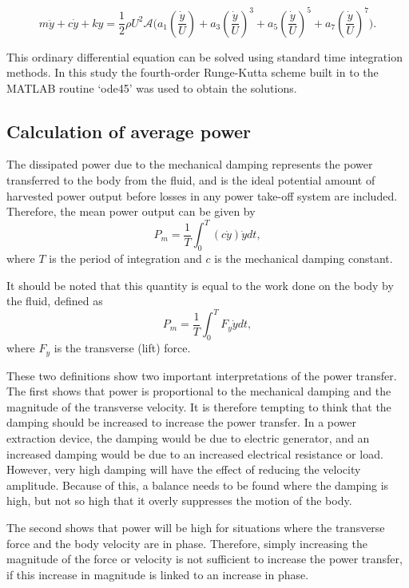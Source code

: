 \begin{equation}
\label{final_equation_motion}
m\ddot{y}{+}c\dot{y}{+}ky{=}\frac{1}{2}\rho U^2 \mathcal {A} \Bigg(a_1\left(\frac{\dot{y}}{U}\right){+}a_3\left(\frac{\dot{y}}{U}\right)^3{+}a_5\left(\frac{\dot{y}}{U}\right)^5{+}a_7\left(\frac{\dot{y}}{U}\right)^7 \Bigg).
\end{equation}

This ordinary differential equation can be solved using standard time integration methods. In this study the fourth-order Runge-Kutta scheme built in to the MATLAB routine `ode45' was used to obtain the solutions. 

\subsection{Calculation of average power}

 The dissipated power due to the mechanical damping represents the power transferred to the body from the fluid, and is the ideal potential amount of harvested power output before losses in any power take-off system are included. Therefore, the mean power output can be given by
\begin{equation}
\label{power}
P_{m}=\frac{1}{T}\int_{0}^{T}(c\dot{y})\dot{y} dt,
\end{equation}
where $T$ is the period of integration and $c$ is the mechanical damping constant. 

It should be noted that this quantity is equal to the work done on the body by the fluid, defined as
\begin{equation}
\label{power_alt}
P_{m}=\frac{1}{T}\int_{0}^{T}F_y\dot{y} dt,
\end{equation}
where $F_y$ is the transverse (lift) force.

These two definitions show two important interpretations of the power transfer. The first shows that power is proportional to the mechanical damping and the magnitude of the transverse velocity. It is therefore tempting to think that the damping should be increased to increase the power transfer. In a power extraction device, the damping would be due to electric generator, and an increased damping would be due to an increased electrical resistance or load. However, very high damping will have the effect of reducing the velocity amplitude. Because of this, a balance needs to be found where the damping is high, but not so high that it overly suppresses the motion of the body.

The second shows that power will be high for situations where the transverse force and the body velocity are in phase. Therefore, simply increasing the magnitude of the force or velocity is not sufficient to increase the power transfer, if this increase in magnitude is linked to an increase in phase.
 
